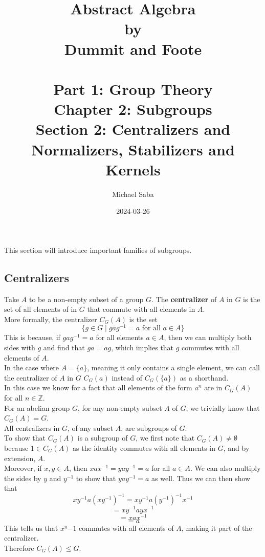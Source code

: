 \documentclass[12pt]{article}
\title{
    \Huge Abstract Algebra \\
    \large by \\
    \Large Dummit and Foote \\~\\
    \huge Part 1: Group Theory \\
    \LARGE Chapter 2: Subgroups \\
    \Large Section 2: Centralizers and Normalizers, Stabilizers and Kernels
}
\date{2024-03-26}
\author{Michael Saba}
\newcommand{\Z}{\mathbb{Z}}
\begin{document}
    \maketitle
    \newpage

    This section will introduce important families of subgroups. \\

    \subsection*{Centralizers}

    Take $A$ to be a non-empty subset of a group $G$.
    The \textbf{centralizer} of $A$ in $G$
    is the set of all elements of in $G$ that commute with all
    elements in $A$. \\
    More formally, the centralizer $C_G(A)$ is the set
    \[ \{ g \in G \mid gag^{-1} = a \text{ for all } a \in A \} \]
    This is because, if $gag^{-1} = a$ for all elements $a \in A$,
    then we can multiply both sides with $g$
    and find that $ga = ag$,
    which implies that $g$ commutes with all elements of $A$. \\

    In the case where $A = \{a\}$,
    meaning it only contains a single element,
    we can call the centralizer of $A$ in $G$
    $C_G(a)$ instead of $C_G(\{a\})$
    as a shorthand. \\
    In this case we know for a fact that all elements
    of the form $a^n$ are in $C_G(A)$ for all $n \in \Z$. \\

    For an abelian group $G$,
    for any non-empty subset $A$ of $G$,
    we trivially know that $C_G(A) = G$. \\

    All centralizers in $G$, of any subset $A$,
    are subgroups of $G$. \\
    To show that $C_G(A)$ is a subgroup of $G$,
    we first note that $C_G(A) \neq \emptyset$
    because $1 \in C_G(A)$ as the identity
    commutes with all elements in $G$,
    and by extension, $A$. \\
    Moreover, if $x, y \in A$,
    then $xax^{-1} = yay^{-1} = a$ for all $a \in A$.
    We can also multiply the sides by $y$ and $y^{-1}$
    to show that $yay^{-1} = a$ as well.
    Thus we can then show that
    \[ xy^{-1}a(xy^{-1})^{-1} = xy^{-1}a(y^{-1})^{-1}x^{-1} \]
    \[ = xy^{-1}ayx^{-1} \]
    \[ = xax^{-1} \]
    \[ = a \]
    This tells us that $x^y{-1}$ commutes with all elements of $A$,
    making it part of the centralizer. \\
    Therefore $C_G(A) \leqslant G$. \\
\end{document}
